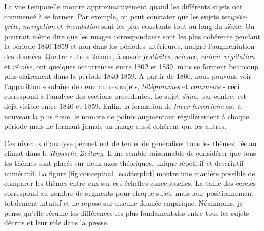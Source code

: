 \documentclass[a4paper,twoside,12pt]{article}
\begin{document}
La vue temporelle montre approximativement quand les différents sujets ont commencé à se former. Par exemple, on peut constater que les sujets \textit{tempête-grêle}, \textit{navigation} et \textit{inondation} sont les plus constants tout au long du siècle. On pourrait même dire que les nuages correspondants sont les plus cohérents pendant la période 1840-1859 et non dans les périodes ultérieures, malgré l'augmentation des données. Quatre autres thèmes, à savoir \textit{festivités}, \textit{science}, \textit{chimie-végétation} et \textit{récolte}, ont quelques occurrences entre 1802 et 1839, mais se forment beaucoup plus clairement dans la période 1840-1859. A partir de 1860, nous pouvons voir l'apparition soudaine de deux autres sujets, \textit{télégrammes} et \textit{commerce} - ceci correspond à l'analyse des sections précédentes. Le sujet \textit{düna}, par contre, est déjà visible entre 1840 et 1859. Enfin, la formation de \textit{hiver-ferroviaire} est à nouveau la plus floue, le nombre de points augmentant régulièrement à chaque période mais ne formant jamais un nuage aussi cohérent que les autres.


Ces niveaux d'analyse permettent de tenter de généraliser tous les thèmes liés au climat dans le \textit{Rigasche Zeitung}. Il me semble raisonnable de considérer que tous les thèmes sont placés sur deux axes théoriques, unique-répétitif et descriptif-numératif. La figure \ref{fig:conceptual_scatterplot} montre une manière possible de comparer les thèmes entre eux sur ces échelles conceptuelles. La taille des cercles correspond au nombre de segments pour chaque sujet, mais leur positionnement totalement intuitif et ne repose sur aucune donnée empirique. Néanmoins, je pense qu'elle résume les différences les plus fondamentales entre tous les sujets décrits et leur rôle dans la presse.
\end{document}

